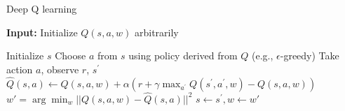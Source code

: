 \documentclass{article}
\begin{document}
\begin{algorithm}[b] 
	\caption{Deep Q learning \label{alg1}} %
	\hspace*{0.02in} {\bf Input:} %
	Initialize $Q(s,a,w)$ arbitrarily
	\begin{algorithmic}[1]
		\State Initialize $s$
		\State Choose $a$ from $s$ using policy derived from $Q$ (e.g., $\epsilon$-greedy)
		\State Take action $a$, observe $r$, $s^{\prime}$
		\State $\hat{Q}(s,a) \gets Q(s,a, w) + \alpha \left ( r + \gamma \max_{a^{\prime}}Q(s^{\prime},a^{\prime}, w) - Q(s, a, w) \right )$
		\State $w' = \arg\min_{w}|| Q(s,a, w) - \hat{Q}(s,a)||^2$
		\State $s\gets s^{\prime}, w \gets w'$
		\EndWhile
		\EndFor
	\end{algorithmic}
\end{algorithm}

\end{document}
